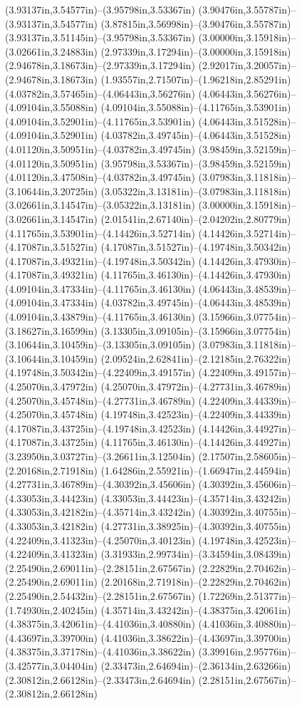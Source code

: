 (3.93137in,3.54577in)--(3.95798in,3.53367in) (3.90476in,3.55787in)--(3.93137in,3.54577in) (3.87815in,3.56998in)--(3.90476in,3.55787in) (3.93137in,3.51145in)--(3.95798in,3.53367in) (3.00000in,3.15918in)--(3.02661in,3.24883in) (2.97339in,3.17294in)--(3.00000in,3.15918in) (2.94678in,3.18673in)--(2.97339in,3.17294in) (2.92017in,3.20057in)--(2.94678in,3.18673in) (1.93557in,2.71507in)--(1.96218in,2.85291in) (4.03782in,3.57465in)--(4.06443in,3.56276in) (4.06443in,3.56276in)--(4.09104in,3.55088in) (4.09104in,3.55088in)--(4.11765in,3.53901in) (4.09104in,3.52901in)--(4.11765in,3.53901in) (4.06443in,3.51528in)--(4.09104in,3.52901in) (4.03782in,3.49745in)--(4.06443in,3.51528in) (4.01120in,3.50951in)--(4.03782in,3.49745in) (3.98459in,3.52159in)--(4.01120in,3.50951in) (3.95798in,3.53367in)--(3.98459in,3.52159in) (4.01120in,3.47508in)--(4.03782in,3.49745in) (3.07983in,3.11818in)--(3.10644in,3.20725in) (3.05322in,3.13181in)--(3.07983in,3.11818in) (3.02661in,3.14547in)--(3.05322in,3.13181in) (3.00000in,3.15918in)--(3.02661in,3.14547in) (2.01541in,2.67140in)--(2.04202in,2.80779in) (4.11765in,3.53901in)--(4.14426in,3.52714in) (4.14426in,3.52714in)--(4.17087in,3.51527in) (4.17087in,3.51527in)--(4.19748in,3.50342in) (4.17087in,3.49321in)--(4.19748in,3.50342in) (4.14426in,3.47930in)--(4.17087in,3.49321in) (4.11765in,3.46130in)--(4.14426in,3.47930in) (4.09104in,3.47334in)--(4.11765in,3.46130in) (4.06443in,3.48539in)--(4.09104in,3.47334in) (4.03782in,3.49745in)--(4.06443in,3.48539in) (4.09104in,3.43879in)--(4.11765in,3.46130in) (3.15966in,3.07754in)--(3.18627in,3.16599in) (3.13305in,3.09105in)--(3.15966in,3.07754in) (3.10644in,3.10459in)--(3.13305in,3.09105in) (3.07983in,3.11818in)--(3.10644in,3.10459in) (2.09524in,2.62841in)--(2.12185in,2.76322in) (4.19748in,3.50342in)--(4.22409in,3.49157in) (4.22409in,3.49157in)--(4.25070in,3.47972in) (4.25070in,3.47972in)--(4.27731in,3.46789in) (4.25070in,3.45748in)--(4.27731in,3.46789in) (4.22409in,3.44339in)--(4.25070in,3.45748in) (4.19748in,3.42523in)--(4.22409in,3.44339in) (4.17087in,3.43725in)--(4.19748in,3.42523in) (4.14426in,3.44927in)--(4.17087in,3.43725in) (4.11765in,3.46130in)--(4.14426in,3.44927in) (3.23950in,3.03727in)--(3.26611in,3.12504in) (2.17507in,2.58605in)--(2.20168in,2.71918in) (1.64286in,2.55921in)--(1.66947in,2.44594in) (4.27731in,3.46789in)--(4.30392in,3.45606in) (4.30392in,3.45606in)--(4.33053in,3.44423in) (4.33053in,3.44423in)--(4.35714in,3.43242in) (4.33053in,3.42182in)--(4.35714in,3.43242in) (4.30392in,3.40755in)--(4.33053in,3.42182in) (4.27731in,3.38925in)--(4.30392in,3.40755in) (4.22409in,3.41323in)--(4.25070in,3.40123in) (4.19748in,3.42523in)--(4.22409in,3.41323in) (3.31933in,2.99734in)--(3.34594in,3.08439in) (2.25490in,2.69011in)--(2.28151in,2.67567in) (2.22829in,2.70462in)--(2.25490in,2.69011in) (2.20168in,2.71918in)--(2.22829in,2.70462in) (2.25490in,2.54432in)--(2.28151in,2.67567in) (1.72269in,2.51377in)--(1.74930in,2.40245in) (4.35714in,3.43242in)--(4.38375in,3.42061in) (4.38375in,3.42061in)--(4.41036in,3.40880in) (4.41036in,3.40880in)--(4.43697in,3.39700in) (4.41036in,3.38622in)--(4.43697in,3.39700in) (4.38375in,3.37178in)--(4.41036in,3.38622in) (3.39916in,2.95776in)--(3.42577in,3.04404in) (2.33473in,2.64694in)--(2.36134in,2.63266in) (2.30812in,2.66128in)--(2.33473in,2.64694in) (2.28151in,2.67567in)--(2.30812in,2.66128in) 